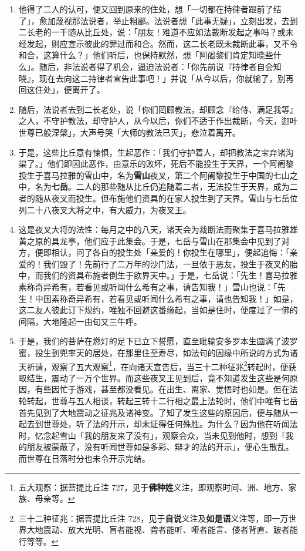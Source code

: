 \begin{enumerate}
\item 他得了二人的认可，便又回到原来的住处，想「一切都在持律者跟前了结了」，愈加蔑视那法说者，举止粗鄙。法说者想「此事无疑」，立刻出发，去到二长老的一千随从比丘处，说：「朋友！难道不应如法裁断发起之事吗？或未经发起，则应宣示彼此的罪过而和合。然而，这二长老既未裁断此事，又不令和合，这算什么？」他们听后，也保持默然，想「阿阇黎们肯定知晓些什么」。随后，非法说者得了机会，逼迫法说者：「你先前说『持律者自会知晓』，现在去向这二持律者宣告此事吧！」并说「从今以后，你就输了，别再回这住处」，便离开了。
\item 随后，法说者去到二长老处，说「你们罔顾教法，却顾念『给侍、满足我等』之人，不守护教法，却守护人，从今以后，你们不适于作出裁断，今天，迦叶世尊已般涅槃」，大声号哭「大师的教法已灭」，悲泣着离开。
\item 于是，这些比丘意有悚惧，生起恶作：「我们守护着人，却把教法之宝弃诸沟渠了。」他们即因此恶作，由意乐的败坏，死后不能投生于天界，一个阿阇黎投生于喜马拉雅的雪山中，名为\textbf{雪山}夜叉，第二个阿阇黎投生于中国的七山之中，名为\textbf{七岳}。二人的那些随从比丘仍追随着二者，无法投生于天界，成为二者的随从夜叉而投生。但布施他们资具的在家人投生到了天界。雪山与七岳位列二十八夜叉大将之中，有大威力，为夜叉王。
\item 这是夜叉大将的法性：每月之中的八天，诸天会为裁断法而聚集于喜马拉雅雄黄之原的具龙亭，他们应于此集会。于是，七岳与雪山在那集会中见到了对方，便即相认，问了各自的投生处「亲爱的！你投生在哪里」，便起追悔：「亲爱的！我们毁了！先前行了二万年的沙门法，一旦依于恶友，投生于夜叉的胎中，而我们的资具布施者倒生于欲界天中。」于是，七岳说：「先生！喜马拉雅素称奇异希有，若看见或听闻什么希有之事，请告知我！」雪山也说：「先生！中国素称奇异希有，若看见或听闻什么希有之事，请也告知我！」如是，这二友人彼此订下规约，唯独不回避这番缘起，当如是住时，便度过了一佛的间隔，大地隆起一由旬又三牛呼。
\item 于是，我们的菩萨在燃灯的足下已立下誓愿，直至毗输安多罗本生圆满了波罗蜜，投生到兜率天的居处，在那里住至寿尽，如法句的因缘中所说的方式为诸天祈请，观察了五大观察\footnote{五大观察：据菩提比丘注 727，见于\textbf{佛种姓}义注，即观察时间、洲、地方、家族、母亲等。}，在向诸天宣告后，当三十二种征兆\footnote{三十二种征兆：据菩提比丘注 728，见于\textbf{自说}义注及\textbf{如是语}义注等，即一万世界大地震动、放大光明、盲者能视、聋者能听、哑者能言、偻者背直、跛者能行等等。}转起时，便获取结生，震动了一万个世界。而这些夜叉王见到后，竟不知道发生这些是何原因，有些因忙于游戏，甚至都没看见。在出生、离家、觉悟时也如是。但在法轮转起，世尊与五人相谈，转起三转十二行相之最上法轮时，他们中唯有七岳首先见到了大地震动之征兆及诸神变。了知了发生这些的原因后，便与随从一起去到世尊处，听了法的开示，却未证得任何殊胜。为什么？因为他在听闻法时，忆念起雪山「我的朋友来了没有」，观察会众，当未见到他时，想到「我的朋友被蒙蔽了，没有听闻世尊如是多彩、辩才的法的开示」，便心生散乱。而世尊在日落时分也未令开示完结。

\end{enumerate}
